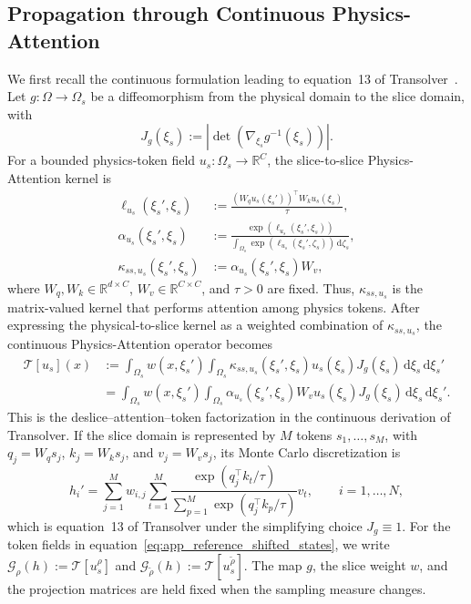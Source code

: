 \documentclass{article}
\def\eqref#1{equation~\ref{#1}}
\begin{document}
\subsection{Propagation through Continuous Physics-Attention}
\label{app:attention_bias}

We first recall the continuous formulation leading to equation~13 of Transolver~\citep{wu2024transolver}. Let $g:\Omega\to\Omega_s$ be a diffeomorphism from the physical domain to the slice domain, with
\begin{equation}
    J_g(\xi_s)
    :=\left|\det\!\left(\nabla_{\xi_s}g^{-1}(\xi_s)\right)\right|.
    \label{eq:app_slice_jacobian}
\end{equation}
For a bounded physics-token field $u_s:\Omega_s\to\mathbb{R}^{C}$, the slice-to-slice Physics-Attention kernel is
\begin{align}
    \ell_{u_s}(\xi_s',\xi_s)
    &:=\frac{(W_qu_s(\xi_s'))^{\top}W_ku_s(\xi_s)}{\tau},
    \nonumber\\
    \alpha_{u_s}(\xi_s',\xi_s)
    &:=\frac{\exp(\ell_{u_s}(\xi_s',\xi_s))}{\int_{\Omega_s}\exp(\ell_{u_s}(\xi_s',\zeta_s))\,\mathrm{d}\zeta_s},
    \nonumber\\
    \kappa_{ss,u_s}(\xi_s',\xi_s)
    &:=\alpha_{u_s}(\xi_s',\xi_s)W_v,
    \label{eq:app_continuous_attention_kernel}
\end{align}
where $W_q,W_k\in\mathbb{R}^{d\times C}$, $W_v\in\mathbb{R}^{C\times C}$, and $\tau>0$ are fixed. Thus, $\kappa_{ss,u_s}$ is the matrix-valued kernel that performs attention among physics tokens. After expressing the physical-to-slice kernel as a weighted combination of $\kappa_{ss,u_s}$, the continuous Physics-Attention operator becomes
\begin{align}
    \mathcal{T}[u_s](x)
    &:=\int_{\Omega_s}w(x,\xi_s')
    \int_{\Omega_s}\kappa_{ss,u_s}(\xi_s',\xi_s)
    u_s(\xi_s)J_g(\xi_s)
    \,\mathrm{d}\xi_s\,\mathrm{d}\xi_s'
    \nonumber\\
    &=\int_{\Omega_s}w(x,\xi_s')
    \int_{\Omega_s}\alpha_{u_s}(\xi_s',\xi_s)
    W_vu_s(\xi_s)J_g(\xi_s)
    \,\mathrm{d}\xi_s\,\mathrm{d}\xi_s'.
    \label{eq:app_continuous_physics_attention}
\end{align}
This is the deslice--attention--token factorization in the continuous derivation of Transolver. If the slice domain is represented by $M$ tokens $s_1,\ldots,s_M$, with $q_j=W_qs_j$, $k_j=W_ks_j$, and $v_j=W_vs_j$, its Monte Carlo discretization is
\begin{equation}
    h_i'
    =\sum_{j=1}^{M}w_{i,j}
    \sum_{t=1}^{M}
    \frac{\exp(q_j^{\top}k_t/\tau)}{\sum_{p=1}^{M}\exp(q_j^{\top}k_p/\tau)}v_t,
    \qquad i=1,\ldots,N,
    \label{eq:app_transolver_discrete_attention}
\end{equation}
which is equation~13 of Transolver under the simplifying choice $J_g\equiv1$. For the token fields in \eqref{eq:app_reference_shifted_states}, we write $\mathcal{G}_{\rho}(h):=\mathcal{T}[u_s^{\rho}]$ and $\mathcal{G}_{\widetilde{\rho}}(h):=\mathcal{T}[u_s^{\widetilde{\rho}}]$. The map $g$, the slice weight $w$, and the projection matrices are held fixed when the sampling measure changes.
\end{document}
